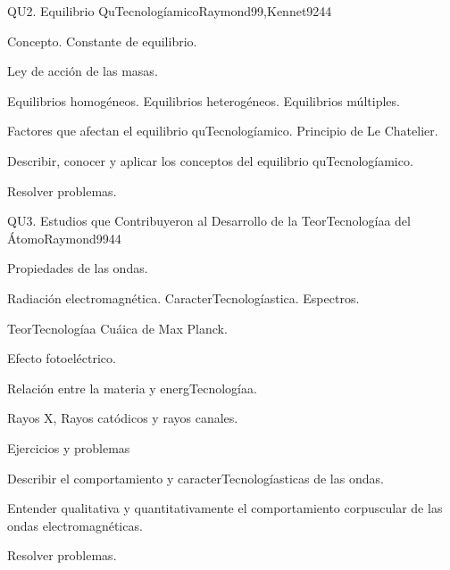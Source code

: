 \begin{syllabus}
\begin{unit}{}{QU2. Equilibrio QuTecnologíamico}{Raymond99,Kennet92}{4}{4}
\begin{topics}
      \item Concepto. Constante de equilibrio.
      \item Ley de acción de las masas.
      \item Equilibrios homogéneos. Equilibrios heterogéneos. Equilibrios múltiples.
      \item Factores que afectan el equilibrio quTecnologíamico. Principio de Le Chatelier.
    \end{topics}
   \begin{learningoutcomes}
      \item Describir, conocer y aplicar los conceptos del equilibrio quTecnologíamico.
      \item Resolver problemas.
   \end{learningoutcomes}
\end{unit}

\begin{unit}{}{QU3. Estudios que Contribuyeron al Desarrollo de la TeorTecnologíaa del Átomo}{Raymond99}{4}{4}
\begin{topics}
      \item Propiedades de las ondas.
      \item Radiación electromagnética. CaracterTecnologíastica. Espectros.
      \item TeorTecnologíaa Cuáica de Max Planck.
      \item Efecto fotoeléctrico.
      \item Relación entre la materia y energTecnologíaa.
      \item Rayos X, Rayos catódicos y rayos canales.
      \item Ejercicios y problemas
\end{topics}

   \begin{learningoutcomes}
      \item Describir el comportamiento y caracterTecnologíasticas de las ondas.
      \item Entender qualitativa y quantitativamente el comportamiento corpuscular de las ondas electromagnéticas.
      \item Resolver problemas.
   \end{learningoutcomes}
\end{unit}


\end{syllabus}
